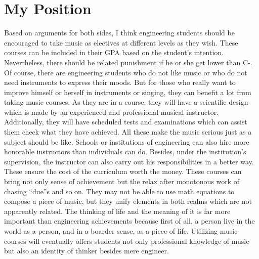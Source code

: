 \section{My Position}
Based on arguments for both sides, I think engineering students should be encouraged to take music as electives at different levels as they wish. These courses can be included in their GPA based on the student’s intention. Nevertheless, there should be related punishment if he or she get lower than C-. Of course, there are engineering students who do not like music or who do not need instruments to express their moods. But for those who really want to improve himself or herself in instruments or singing, they can benefit a lot from taking music courses. As they are in a course, they will have a scientific design which is made by an experienced and professional musical instructor. Additionally, they will have scheduled tests and examinations which can assist them check what they have achieved. All these make the music serious just as a subject should be like. Schools or institutions of engineering can also hire more honorable instructors than individuals can do. Besides, under the institution’s supervision, the instructor can also carry out his responsibilities in a better way. These ensure the cost of the curriculum worth the money. These courses can bring not only sense of achievement but the relax after monotonous work of chasing “due”s and so on. They may not be able to use math equations to compose a piece of music, but they unify elements in both realms which are not apparently related. The thinking of life and the meaning of it is far more important than engineering achievements because first of all, a person live in the world as a person, and in a boarder sense, as a piece of life. Utilizing music courses will eventually offers students not only professional knowledge of music but also an identity of thinker besides mere engineer. 

